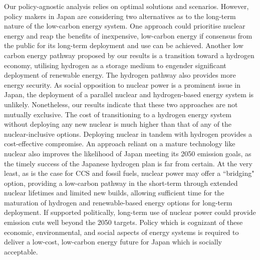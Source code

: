 Our policy-agnostic analysis relies on optimal solutions and scenarios. However, policy makers in Japan are considering two alternatives as to the long-term nature of the low-carbon energy system. One approach could prioritise nuclear energy and reap the benefits of inexpensive, low-carbon energy if consensus from the public for its long-term deployment and use can be achieved. Another low carbon energy pathway proposed by our results is a transition toward a hydrogen economy, utilising hydrogen as a storage medium to engender significant deployment of renewable energy. The hydrogen pathway also provides more energy security. As social opposition to nuclear power is a prominent issue in Japan, the deployment of a parallel nuclear and hydrogen-based energy system is unlikely. Nonetheless, our results indicate that these two approaches are not mutually exclusive. The cost of transitioning to a hydrogen energy system without deploying any new nuclear is much higher than that of any of the nuclear-inclusive options. Deploying nuclear in tandem with hydrogen provides a cost-effective compromise. An approach reliant on a mature technology like nuclear also improves the likelihood of Japan meeting its 2050 emission goals, as the timely success of the Japanese hydrogen plan is far from certain. At the very least, as is the case for CCS and fossil fuels, nuclear power may offer a ``bridging" option, providing a low-carbon pathway in the short-term through extended nuclear lifetimes and limited new builds, allowing sufficient time for the maturation of hydrogen and renewable-based energy options for long-term deployment. If supported politically, long-term use of nuclear power could provide emission cuts well beyond the 2050 targets. Policy which is cognizant of these economic, environmental, and social aspects of energy systems is required to deliver a low-cost, low-carbon energy future for Japan which is socially acceptable.